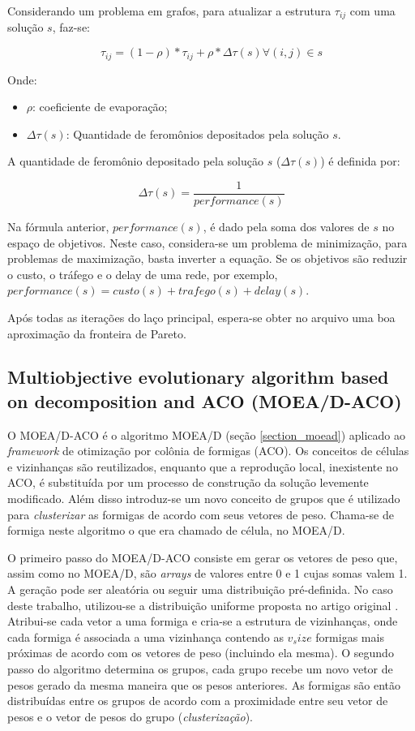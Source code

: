 Considerando um problema em grafos, para atualizar a estrutura $\tau_{ij}$ com uma solução $s$, faz-se:

\[\tau_{ij} = (1 - \rho) * \tau_{ij} + \rho * \Delta\tau(s) \forall(i,j) \in s\]

Onde:
\begin{itemize} 
	\item $\rho$: coeficiente de evaporação;
	\item $\Delta\tau(s)$: Quantidade de feromônios depositados pela solução $s$.
\end{itemize}

A quantidade de feromônio depositado pela solução $s$ ($\Delta\tau(s)$) é definida por:

\[\Delta\tau(s) = \frac{1}{performance(s)}\]

Na fórmula anterior, $performance(s)$, é dado pela soma dos valores de $s$ no espaço de objetivos. Neste caso, considera-se um problema de minimização, para problemas de maximização, basta inverter a equação. Se os objetivos são reduzir o custo, o tráfego e o delay de uma rede, por exemplo, $performance(s) = custo(s) + trafego(s) + delay(s)$.

Após todas as iterações do laço principal, espera-se obter no arquivo uma boa aproximação da fronteira de Pareto. 

\subsection{Multiobjective evolutionary algorithm based on decomposition and ACO (MOEA/D-ACO)}
O MOEA/D-ACO \cite{Ke2013} é o algoritmo MOEA/D (seção \ref{section_moead}) aplicado ao \textit{framework} de otimização por colônia de formigas (ACO). Os conceitos de células e vizinhanças são reutilizados, enquanto que a reprodução local, inexistente no ACO, é substituída por um processo de construção da solução levemente modificado. Além disso introduz-se um novo conceito de grupos que é utilizado para \textit{clusterizar} as formigas de acordo com seus vetores de peso. Chama-se de formiga neste algoritmo o que era chamado de célula, no MOEA/D.

O primeiro passo do MOEA/D-ACO consiste em gerar os vetores de peso que, assim como no MOEA/D, são \textit{arrays} de valores entre 0 e 1 cujas somas valem 1. A geração pode ser aleatória ou seguir uma distribuição pré-definida. No caso deste trabalho, utilizou-se a distribuição uniforme proposta no artigo original \cite{Ke2013}. Atribui-se cada vetor a uma formiga e cria-se a estrutura de vizinhanças, onde cada formiga é associada a uma vizinhança contendo as $v_size$ formigas mais próximas de acordo com os vetores de peso (incluindo ela mesma). O segundo passo do algoritmo determina os grupos, cada grupo recebe um novo vetor de pesos gerado da mesma maneira que os pesos anteriores. As formigas são então distribuídas entre os grupos de acordo com a proximidade entre seu vetor de pesos e o vetor de pesos do grupo (\textit{clusterização}).

